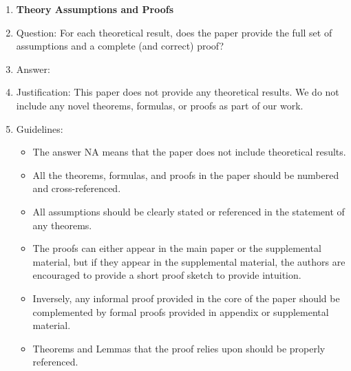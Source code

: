 \begin{enumerate}
\item {\bf Theory Assumptions and Proofs}
    \item[] Question: For each theoretical result, does the paper provide the full set of assumptions and a complete (and correct) proof?
    \item[] Answer: \answerNA{}
    \item[] Justification: This paper does not provide any theoretical results. We do not include any novel theorems, formulas, or proofs as part of our work.
    \item[] Guidelines:
    \begin{itemize}
        \item The answer NA means that the paper does not include theoretical results. 
        \item All the theorems, formulas, and proofs in the paper should be numbered and cross-referenced.
        \item All assumptions should be clearly stated or referenced in the statement of any theorems.
        \item The proofs can either appear in the main paper or the supplemental material, but if they appear in the supplemental material, the authors are encouraged to provide a short proof sketch to provide intuition. 
        \item Inversely, any informal proof provided in the core of the paper should be complemented by formal proofs provided in appendix or supplemental material.
        \item Theorems and Lemmas that the proof relies upon should be properly referenced. 
    \end{itemize}


\end{enumerate}
